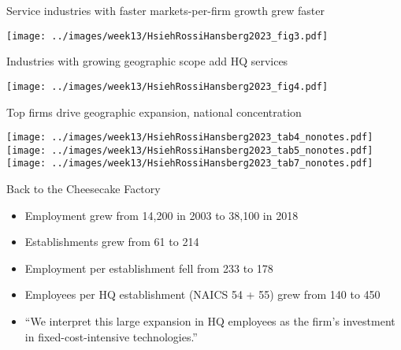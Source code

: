 \documentclass[11pt,notes=hide,aspectratio=169]{beamer}
\begin{document}
\begin{frame}{Service industries with faster markets-per-firm growth grew faster}
\begin{center}
\texttt{[image: ../images/week13/HsiehRossiHansberg2023\_fig3.pdf]}
\end{center}
\end{frame}
\begin{frame}{Industries with growing geographic scope add HQ services}
\begin{center}
\texttt{[image: ../images/week13/HsiehRossiHansberg2023\_fig4.pdf]}
\end{center}
\end{frame}
\begin{frame}{Top firms drive geographic expansion, national concentration}
\begin{center}
\texttt{[image: ../images/week13/HsiehRossiHansberg2023\_tab4\_nonotes.pdf]}
\texttt{[image: ../images/week13/HsiehRossiHansberg2023\_tab5\_nonotes.pdf]}
\texttt{[image: ../images/week13/HsiehRossiHansberg2023\_tab7\_nonotes.pdf]}
\end{center}
\end{frame}
\begin{frame}{Back to the Cheesecake Factory}
\begin{itemize}
\item Employment grew from 14,200 in 2003 to 38,100 in 2018
\item Establishments grew from 61 to 214 
\item Employment per establishment fell from 233 to 178
\item Employees per HQ establishment (NAICS 54 + 55) grew from 140 to 450
\item ``We interpret this large expansion in HQ employees as the firm's investment in fixed-cost-intensive technologies.''
\end{itemize}
\end{frame}
\end{document}
